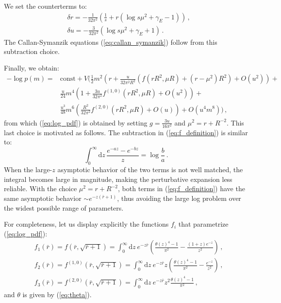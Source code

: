 \documentclass[11pt,a4paper]{article}
\newcommand{\dd}{\mathrm{d}}
\begin{document}
We set the counterterms to:
\begin{align}
    &\delta r = -\frac{1}{32\pi^2}\left(\frac{1}{s} + r\left(\log s \mu^2 + \gamma_E - 1\right)\right)\,,\\
    &\delta u = -\frac{3}{32\pi^2}\left(\log s\mu^2 +\gamma_E + 1\right)\,.
\end{align}
The Callan-Symanzik equations (\ref{eq:callan_symanzik}) follow from this
subtraction choice.

Finally, we obtain:
\begin{equation}
\begin{split}
    \label{eq:log_pdf_with_mu}
    -\log p(m) =& \mathrm{const}+ V \Bigg(
    \frac{1}{2} m^2\left( r + \frac{u}{32\pi^2R^2}  \left(f(rR^2, \mu R) + (r - \mu^2)R^2\right) + O(u^2)\right) + \\
    &\frac{u}{24} m^4 \left(1 + \frac{3u}{32\pi^2} f^{(1, 0)}(rR^2, \mu R) + O(u^2)\right) + \\
    &\frac{u^3}{48}m^6\left(\frac{R^2}{32\pi^2}f^{(2, 0)}(rR^2, \mu R) + O(u)\right) + O(u^4 m^8) \Bigg)\,,
\end{split}
\end{equation}
from which (\ref{eq:log_pdf}) is obtained by setting $g = \frac{3 u}{16
\pi^2}$ and $\mu^2 = r + R^{-2}$. This last choice is motivated as follows. The
subtraction in (\ref{eq:f_definition}) is similar to:
\begin{equation}
    \int_0^{\infty} \dd z\, \frac{e^{-a z} - e^{-b z}}{z} = \log \frac{b}{a}\,.
\end{equation}
When the large-$z$ asymptotic behavior of the two terms is not well
matched, the integral becomes large in magnitude, making the perturbative
expansion less reliable. With the choice $\mu^2 = r + R^{-2}$, both terms in
(\ref{eq:f_definition}) have the same asymptotic behavior $\sim e^{-z(\bar{r} +
1)}$, thus avoiding the large log problem over the widest possible range of
parameters.

For completeness, let us display explicitly the functions $f_i$ that
parametrize (\ref{eq:log_pdf}):
\begin{align}
\label{eq:f_functions}
    &f_1(\bar r) = f(\bar r, \sqrt{\bar r + 1}) = 
    \int_{0}^{\infty} \dd z\ e^{-z \bar{r}} \left(\frac{\theta(z)^4 - 1}{\pi^2} - 
    \frac{(1 + z) e^{-z}}{z^2}\right)\,,\\
    &f_2(\bar r) = f^{(1, 0)}(\bar r, \sqrt{\bar r + 1}) = 
    \int_{0}^{\infty} \dd z\ e^{-z \bar{r}} z \left(\frac{\theta(z)^4 - 1}{\pi^2} - 
    \frac{e^{-z}}{z^2}\right)\,,\\
    &f_3(\bar r) = f^{(2, 0)}(\bar r, \sqrt{\bar r + 1}) = 
    \int_{0}^{\infty} \dd z\ e^{-z \bar{r}} z^2 \frac{\theta(z)^4 - 1}{\pi^2}\,,
\end{align}
and $\theta$ is given by (\ref{eq:theta}).
\end{document}
